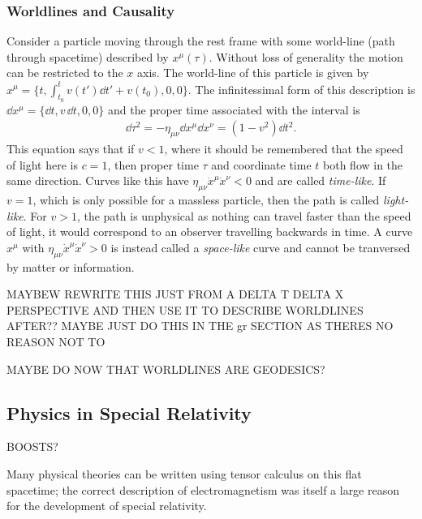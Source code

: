 \subsubsection{Worldlines and Causality}
Consider a particle moving through the rest frame with some world-line (path through spacetime) described by $x^\mu(\tau)$. Without loss of generality the motion can be restricted to the $x$ axis. The world-line of this particle is given by $x^\mu = \{t, \int^t_{t_0} v(t') \dd t' + v(t_0) ,0,0  \}$. The infinitessimal form of this description is $\dd x^\mu = \{ \dd t , v \,\dd t,0,0\}$ and the proper time associated with the interval is 
\begin{align}
\dd \tau ^2 = - \eta_{\mu\nu}\dd x^\mu \dd x^\nu = (1-v^2)\dd t^2.
\end{align}
This equation says that if $v<1$, where it should be remembered that the speed of light here is $c=1$, then proper time $\tau$ and coordinate time $t$ both flow in the same direction. Curves like this have $\eta_{\mu\nu} \dot x^\mu \dot x^\nu < 0$ and are called {\it time-like}. If $v=1$, which is only possible for a massless particle, then the path is called {\it light-like}. For $v>1$, the path is unphysical as nothing can travel faster than the speed of light, it would correspond to an observer travelling backwards in time. A curve $x^\mu$ with $\eta_{\mu\nu} \dot x^\mu \dot x^\nu > 0 $ is instead called a {\it space-like} curve and cannot be tranversed by matter or information. 

MAYBEW REWRITE THIS JUST FROM A DELTA T DELTA X PERSPECTIVE AND THEN USE IT TO DESCRIBE WORLDLINES AFTER?? MAYBE JUST DO THIS IN THE gr SECTION AS THERES NO REASON NOT TO

MAYBE DO NOW THAT WORLDLINES ARE GEODESICS?

\subsection{Physics in Special Relativity}

BOOSTS?

Many physical theories can be written using tensor calculus on this flat spacetime; the correct description of electromagnetism was itself a large reason for the development of special relativity. 

